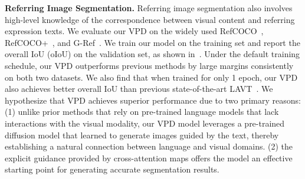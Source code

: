 \documentclass[10pt,twocolumn,letterpaper]{article}
\newcommand{\paragrapha}[2][4pt]{\vspace{#1}\noindent\textbf{#2}}
\begin{document}
\begin{table}[t]
  \centering
  \caption{\textbf{Semantic segmentation with fewer training iterations.} We compare the performance of our VPD with previous models with different architectures and different pre-training methods. The performance is measured by the mIoU of single-scale and multi-scale at 4K/8K iterations.}\vspace{3pt}
  \label{tab:seg_fast}\vspace{-10pt}
\end{table}





\paragrapha{Referring Image Segmentation.} Referring image segmentation also involves high-level knowledge of the correspondence between visual content and referring expression texts. We evaluate our VPD on the widely used RefCOCO~\cite{yu2016refcoco}, RefCOCO+~\cite{yu2016refcoco}, and G-Ref~\cite{nagaraja2016gref_umd}. We train our model on the training set and report the overall IoU (oIoU) on the validation set, as shown in~. Under the default training schedule, our VPD outperforms previous methods by large margins consistently on both two datasets. We also find that when trained for only 1 epoch, our VPD also achieves better overall IoU than previous state-of-the-art LAVT~\cite{yang2022lavt}. We hypothesize that VPD achieves superior performance due to two primary reasons: (1) unlike prior methods that rely on pre-trained language models that lack interactions with the visual modality, our VPD model leverages a pre-trained diffusion model that learned to generate images guided by the text, thereby establishing a natural connection between language and visual domains. (2) the explicit guidance provided by cross-attention maps offers the model an effective starting point for generating accurate segmentation results.
\end{document}
